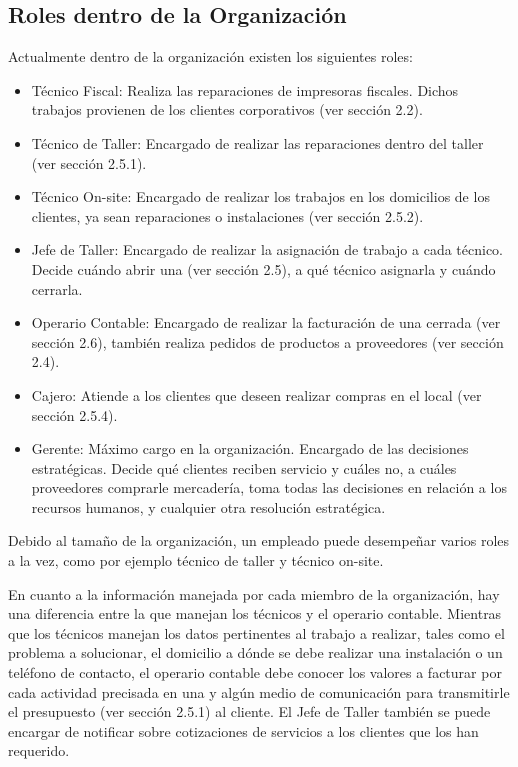 \documentclass[12pt]{extarticle}
\begin{document}
\begin{spacing}{1.2}
    \subsection{Roles dentro de la Organización}
    Actualmente dentro de la organización existen los siguientes roles:
    \begin{itemize}
        \item Técnico Fiscal: Realiza las reparaciones de impresoras fiscales. Dichos trabajos provienen de los clientes corporativos (ver sección 2.2).
        \item Técnico de Taller: Encargado de realizar las reparaciones dentro del taller (ver sección 2.5.1). 
        \item Técnico On-site: Encargado de realizar los trabajos en los domicilios de los clientes, ya sean reparaciones o instalaciones (ver sección 2.5.2).
        \item Jefe de Taller: Encargado de realizar la asignación de trabajo a cada técnico. Decide cuándo abrir una \OT{} (ver sección 2.5), a qué técnico asignarla y cuándo cerrarla.
        \item Operario Contable: Encargado de realizar la facturación de una \OT{} cerrada (ver sección 2.6), también realiza pedidos de productos a proveedores (ver sección 2.4).
        \item Cajero: Atiende a los clientes que deseen realizar compras en el local (ver sección 2.5.4).
        \item Gerente: Máximo cargo en la organización. Encargado de las decisiones estratégicas. Decide qué clientes reciben servicio y cuáles no, a cuáles proveedores comprarle mercadería, toma todas las decisiones en relación a los recursos humanos, y cualquier otra resolución estratégica.  
    \end{itemize}
    

    Debido al tamaño de la organización, un empleado puede desempeñar varios roles a la vez, como por ejemplo técnico de taller y técnico on-site.  

    En cuanto a la información manejada por cada miembro de la organización, hay una diferencia entre la que manejan los técnicos y el operario contable. Mientras que los técnicos manejan los datos pertinentes al trabajo a realizar, tales como el problema a solucionar, el domicilio a dónde se debe realizar una instalación o un teléfono de contacto, el operario contable debe conocer los valores a facturar por cada actividad precisada en una \OT{} y algún medio de comunicación para transmitirle el presupuesto (ver sección 2.5.1) al cliente. El Jefe de Taller también se puede encargar de notificar sobre cotizaciones de servicios a los clientes que los han requerido.


\end{spacing}
\end{document}
